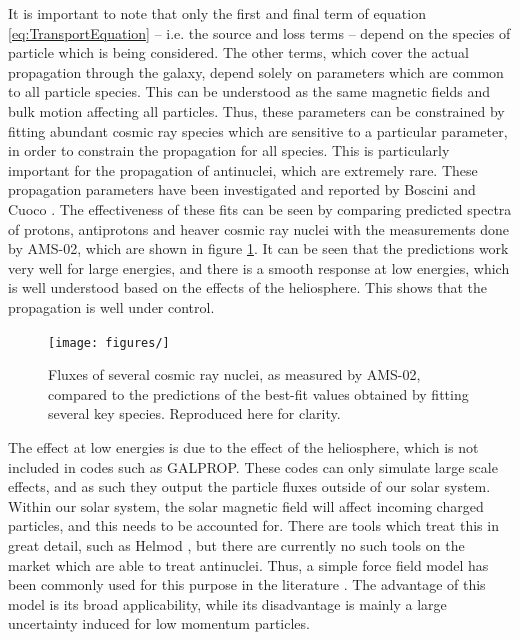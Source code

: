 It is important to note that only the first and final term of equation \ref{eq:TransportEquation} -- i.e. the source and loss terms -- depend on the species of particle which is being considered. The other terms, which cover the actual propagation through the galaxy, depend solely on parameters which are common to all particle species. This can be understood as the same magnetic fields and bulk motion affecting all particles. Thus, these parameters can be constrained by fitting abundant cosmic ray species which are sensitive to a particular parameter, in order to constrain the propagation for all species. This is particularly important for the propagation of antinuclei, which are extremely rare. These propagation parameters have been investigated and reported by Boscini\cite{} and Cuoco \cite{}. The effectiveness of these fits can be seen by comparing predicted spectra of protons, antiprotons and heaver cosmic ray nuclei with the measurements done by AMS-02, which are shown in figure \ref{fig:BosciniFits}. It can be seen that the predictions work very well for large energies, and there is a smooth response at low energies, which is well understood based on the effects of the heliosphere. This shows that the propagation is well under control.\\

\begin{figure}
    \centering
    \texttt{[image: figures/]}
    \caption{Fluxes of several cosmic ray nuclei, as measured by AMS-02, compared to the predictions of the best-fit values obtained by fitting several key species\cite{}. Reproduced here for clarity.}
    \label{fig:BosciniFits}
\end{figure}

The effect at low energies is due to the effect of the heliosphere, which is not included in codes such as GALPROP. These codes can only simulate large scale effects, and as such they output the particle fluxes outside of our solar system. Within our solar system, the solar magnetic field will affect incoming charged particles, and this needs to be accounted for. There are tools which treat this in great detail, such as Helmod \cite{}, but there are currently no such tools on the market which are able to treat antinuclei. Thus, a simple force field model has been commonly used for this purpose in the literature \cite{}. The advantage of this model is its broad applicability, while its disadvantage is mainly a large uncertainty induced for low momentum particles\cite{}. \\

